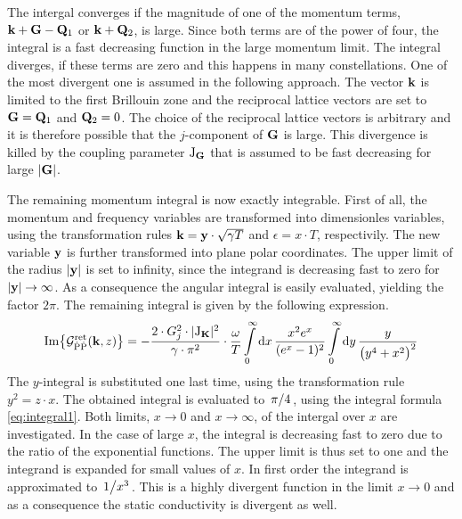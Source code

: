 The intergal converges if the magnitude of one of the momentum terms, $\vb{k}+\vb{G}-\vb{Q}_{1}$ or $\vb{k} + \vb{Q}_{2}$, is large.
Since both terms are of the power of four, the integral is a fast decreasing function in the large momentum limit.
The integral diverges, if these terms are zero and this happens in many constellations.
One of the most divergent one is assumed in the following approach.
The vector $\vb{k}$ is limited to the first Brillouin zone and the reciprocal lattice vectors are set to $\vb{G} = \vb{Q}_{1}$ and $\vb{Q}_{2} = 0$.
The choice of the reciprocal lattice vectors is arbitrary and it is therefore possible that the $j$-component of $\vb{G}$ is large.
This divergence is killed by the coupling parameter $\mathrm{J}_{\vb{G}}$ that is assumed to be fast decreasing for large $|\vb{G}|$.

The remaining momentum integral is now exactly integrable.
First of all, the momentum and frequency variables are transformed into dimensionles variables, using the transformation rules $\vb{k} = \vb{y} \cdot \sqrt{\gamma T}$ and $\epsilon = x \cdot T$, respectivily.
The new variable $\vb{y}$ is further transformed into plane polar coordinates.
The upper limit of the radius $|\vb{y}|$ is set to infinity, since the integrand is decreasing fast to zero for $|\vb{y}| \to \infty$.
As a consequence the angular integral is easily evaluated, yielding the factor $2\pi$.
The remaining integral is given by the following expression.
%
\begin{align}
	\Im{\mathcal{G}_{\dot{\mathrm{P}}\dot{\mathrm{P}}}^{\mathrm{ret}}(\vb{k}, z)} = 
		 -\frac{2 \cdot G_{j}^{2} \cdot \vert \mathrm{J}_{\vb{K}} \vert^{2}}{\gamma \cdot \pi^{2}} \cdot \frac{\omega}{T}
		\int\limits_{0}^{\infty} \dd{x}
		\frac{x^{2} e^{x}}{(e^{x} - 1)^{2}}
		\int\limits_{0}^{\infty} \dd{y}
		\frac{y}{\big(y^{4} + x^{2}\big)^{2}}
\end{align}
%
The $y$-integral is substituted one last time, using the transformation rule $y^{2} = z \cdot x$.
The obtained integral is evaluated to $\flatfrac{\pi}{4}$, using the integral formula \eqref{eq:integral1}.
Both limits, $x \to 0$ and $x \to \infty$, of the intergal over $x$ are investigated.
In the case of large $x$, the integral is decreasing fast to zero due to the ratio of the exponential functions.
The upper limit is thus set to one and the integrand is expanded for small values of $x$.
In first order the integrand is approximated to $\flatfrac{1}{x^{3}}$.
This is a highly divergent function in the limit $x \to 0$ and as a consequence the static conductivity is divergent as well.

